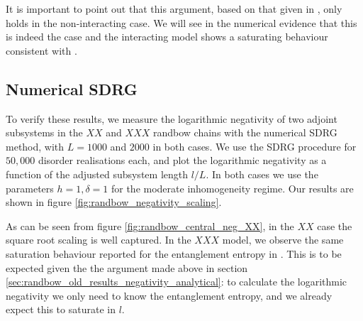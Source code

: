 It is important to point out that this argument, based on that given in \cite{paola2018}, only holds in the non-interacting case. We will see in the numerical evidence that this is indeed the case and the interacting model shows a saturating behaviour consistent with \cite{paola2018}. 

\subsection{Numerical SDRG}\label{subsec:neg_sdrg_results}
To verify these results, we measure the logarithmic negativity of two adjoint subsystems in the $XX$ and $XXX$ randbow chains with the numerical SDRG method, with $L = 1000$ and $2000$ in both cases. We use the SDRG procedure for $50,000$ disorder realisations each, and plot the logarithmic negativity as a function of the adjusted subsystem length $l / L$. In both cases we use the parameters $h = 1, \delta = 1$ for the moderate inhomogeneity regime. Our results are shown in figure \ref{fig:randbow_negativity_scaling}.


As can be seen from figure \ref{fig:randbow_central_neg_XX}, in the $XX$ case the square root scaling is well captured. In the $XXX$ model, we observe the same saturation behaviour reported for the entanglement entropy in \cite{paola2018}. This is to be expected given the the argument made above in section \ref{sec:randbow_old_results_negativity_analytical}: to calculate the logarithmic negativity we only need to know the entanglement entropy, and we already expect this to saturate in $l$. 




